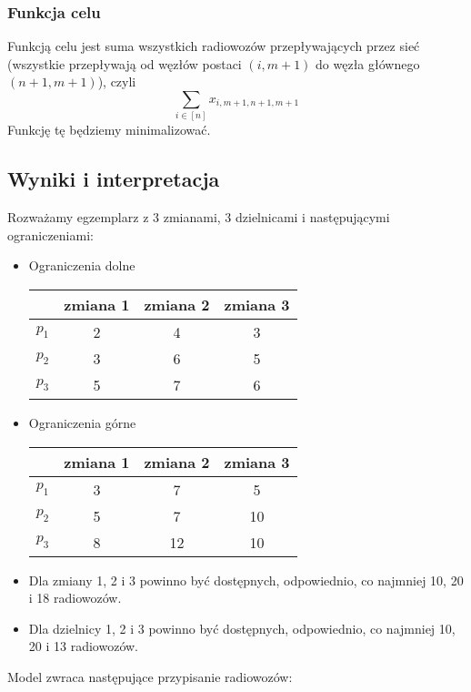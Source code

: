 \documentclass{article}
\begin{document}
\subsubsection{Funkcja celu}
Funkcją celu jest suma wszystkich radiowozów przepływających przez sieć (wszystkie przepływają od węzłów postaci $(i,m+1)$ do węzła głównego $(n+1,m+1)$), czyli
$$\sum_{i\in[n]}x_{i,m+1,n+1,m+1} $$
Funkcję tę będziemy minimalizować.

\subsection{Wyniki i interpretacja}
Rozważamy egzemplarz z $3$ zmianami, $3$ dzielnicami i następującymi ograniczeniami:
\begin{itemize}
\item Ograniczenia dolne
\begin{center}
\begin{tabular}{c c c c}
 & zmiana 1 & zmiana 2 & zmiana 3\\
 \hline
$p_1$ & 2 & 4 & 3\\
\hline
$p_2$ & 3 & 6 & 5 \\
\hline
$p_3$ & 5 & 7 & 6 \\
\hline
\end{tabular}
\end{center}
\item Ograniczenia górne
\begin{center}
\begin{tabular}{c c c c}
 & zmiana 1 & zmiana 2 & zmiana 3\\
 \hline
$p_1$ & 3 & 7 & 5\\
\hline
$p_2$ & 5 & 7 & 10 \\
\hline
$p_3$ & 8 & 12 & 10 \\
\hline
\end{tabular}

\end{center}
\item Dla zmiany 1, 2 i 3 powinno być dostępnych, odpowiednio, co najmniej 10, 20 i 18 radiowozów.
\item Dla dzielnicy 1, 2 i 3 powinno być dostępnych, odpowiednio, co najmniej 10, 20 i 13 radiowozów.
\end{itemize}

Model zwraca następujące przypisanie radiowozów:
\end{document}
